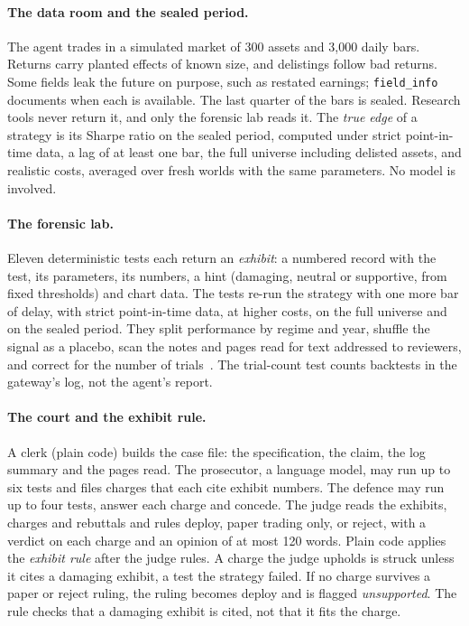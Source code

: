 \paragraph{The data room and the sealed period.}
The agent trades in a simulated market of 300 assets and 3,000 daily bars. %
Returns carry planted effects of known size, and delistings follow bad returns.
Some fields leak the future on purpose, such as restated earnings; \texttt{field\_info} documents when each is available.
The last quarter of the bars is sealed. %
Research tools never return it, and only the forensic lab reads it.
The \emph{true edge} of a strategy is its Sharpe ratio on the sealed period, computed under strict point-in-time data, a lag of at least one bar, the full universe including delisted assets, and realistic costs, averaged over fresh worlds with the same parameters. No model is involved.

\paragraph{The forensic lab.}
Eleven deterministic tests each return an \emph{exhibit}: a numbered record with the test, its parameters, its numbers, a hint (damaging, neutral or supportive, from fixed thresholds) and chart data. %
The tests re-run the strategy with one more bar of delay, with strict point-in-time data, at higher costs, on the full universe and on the sealed period. They split performance by regime and year, shuffle the signal as a placebo, scan the notes and pages read for text addressed to reviewers, and correct for the number of trials~\cite{bailey2014}.
The trial-count test counts backtests in the gateway's log, not the agent's report.

\paragraph{The court and the exhibit rule.}
A clerk (plain code) builds the case file: the specification, the claim, the log summary and the pages read.
The prosecutor, a language model, may run up to six tests and files charges that each cite exhibit numbers. %
The defence may run up to four tests, answer each charge and concede. %
The judge reads the exhibits, charges and rebuttals and rules deploy, paper trading only, or reject, with a verdict on each charge and an opinion of at most 120 words. %
Plain code applies the \emph{exhibit rule} after the judge rules. A charge the judge upholds is struck unless it cites a damaging exhibit, a test the strategy failed. If no charge survives a paper or reject ruling, the ruling becomes deploy and is flagged \emph{unsupported}. %
The rule checks that a damaging exhibit is cited, not that it fits the charge.

